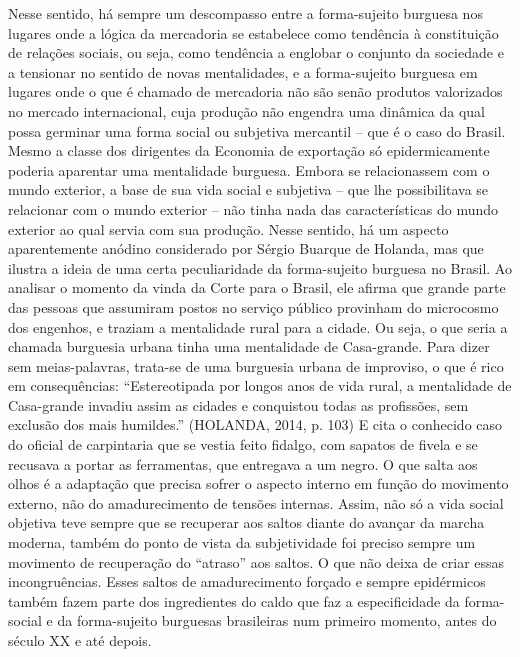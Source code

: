 Nesse sentido, há sempre um descompasso entre a forma-sujeito burguesa
nos lugares onde a lógica da mercadoria se estabelece como tendência à
constituição de relações sociais, ou seja, como tendência a englobar o
conjunto da sociedade e a tensionar no sentido de novas mentalidades, e
a forma-sujeito burguesa em lugares onde o que é chamado de mercadoria
não são senão produtos valorizados no mercado internacional, cuja
produção não engendra uma dinâmica da qual possa germinar uma forma
social ou subjetiva mercantil -- que é o caso do Brasil. Mesmo a classe
dos dirigentes da Economia de exportação só epidermicamente poderia
aparentar uma mentalidade burguesa. Embora se relacionassem com o mundo
exterior, a base de sua vida social e subjetiva -- que lhe possibilitava
se relacionar com o mundo exterior -- não tinha nada das características
do mundo exterior ao qual servia com sua produção. Nesse sentido, há um
aspecto aparentemente anódino considerado por Sérgio Buarque de Holanda,
mas que ilustra a ideia de uma certa peculiaridade da forma-sujeito
burguesa no Brasil. Ao analisar o momento da vinda da Corte para o
Brasil, ele afirma que grande parte das pessoas que assumiram postos no
serviço público provinham do microcosmo dos engenhos, e traziam a
mentalidade rural para a cidade. Ou seja, o que seria a chamada
burguesia urbana tinha uma mentalidade de Casa-grande. Para dizer sem
meias-palavras, trata-se de uma burguesia urbana de improviso, o que é
rico em consequências: ``Estereotipada por longos anos de vida rural, a
mentalidade de Casa-grande invadiu assim as cidades e conquistou todas
as profissões, sem exclusão dos mais humildes.'' (HOLANDA, 2014, p. 103)
E cita o conhecido caso do oficial de carpintaria que se vestia feito
fidalgo, com sapatos de fivela e se recusava a portar as ferramentas,
que entregava a um negro. O que salta aos olhos é a adaptação que
precisa sofrer o aspecto interno em função do movimento externo, não do
amadurecimento de tensões internas. Assim, não só a vida social objetiva
teve sempre que se recuperar aos saltos diante do avançar da marcha
moderna, também do ponto de vista da subjetividade foi preciso sempre um
movimento de recuperação do ``atraso'' aos saltos. O que não deixa de
criar essas incongruências. Esses saltos de amadurecimento forçado e
sempre epidérmicos também fazem parte dos ingredientes do caldo que faz
a especificidade da forma-social e da forma-sujeito burguesas
brasileiras num primeiro momento, antes do século XX e até depois.

